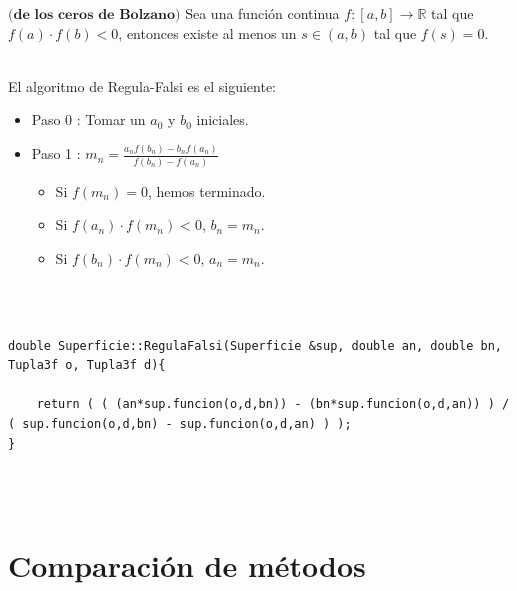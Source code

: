 \begin{teorema}\label{teo:bolzano}
	$\textbf{(de los ceros de Bolzano)}$ Sea una función continua $f : [a,b] \to \mathbb{R}$ tal que $f(a) \cdot f(b) < 0$, entonces existe al menos un $s \in (a,b)$ tal que $f(s) = 0$.
\end{teorema}
${ }$\\



El algoritmo de Regula-Falsi es el siguiente:

\begin{itemize}
	\item Paso 0 : Tomar un $a_0$ y $b_0$ iniciales.
	\item Paso 1 : $m_n = \frac{a_n f(b_n) - b_n f(a_n)}{f(b_n) - f(a_n)}$
	\begin{itemize}
		\item Si $f(m_n)=0$, hemos terminado.
		\item Si $f(a_n) \cdot f(m_n) < 0$, $b_n = m_n$.
		\item Si $f(b_n) \cdot f(m_n) < 0$, $a_n = m_n$.
	\end{itemize}
\end{itemize}
${ }$\\

\begin{lstlisting}[style=Consola]

double Superficie::RegulaFalsi(Superficie &sup, double an, double bn, Tupla3f o, Tupla3f d){

	return ( ( (an*sup.funcion(o,d,bn)) - (bn*sup.funcion(o,d,an)) ) / ( sup.funcion(o,d,bn) - sup.funcion(o,d,an) ) );
}

\end{lstlisting}
${ }$\\




${ }$\\
\section{Comparación de métodos}
${ }$\\


